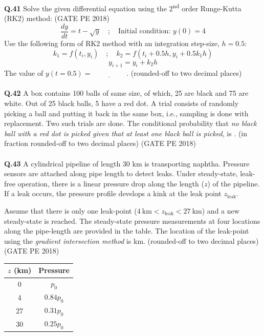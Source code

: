 \documentclass[journal,12pt,onecolumn]{IEEEtran}
\theoremstyle{remark}
\begin{document}
\pagebreak

\noindent\textbf{Q.41} Solve the given differential equation using the 2\textsuperscript{nd} order Runge-Kutta (RK2) method: \hfill (GATE PE 2018)
\[ \frac{dy}{dt} = t - \sqrt{y} \quad ; \quad \text{Initial condition: } y(0) = 4 \]
Use the following form of RK2 method with an integration step-size, $h = 0.5$:
\[ k_1 = f(t_i, y_i) \quad ; \quad k_2 = f(t_i + 0.5h, y_i + 0.5k_1 h) \]
\[ y_{i+1} = y_i + k_2 h \]
The value of $y(t = 0.5) = \underline{\hspace{2cm}}$. (rounded-off to two decimal places)\\\\

\noindent\textbf{Q.42} A box contains 100 balls of same size, of which, 25 are black and 75 are white. Out of 25 black balls, 5 have a red dot. A trial consists of randomly picking a ball and putting it back in the same box, i.e., sampling is done with replacement. Two such trials are done. The conditional probability that \textit{no black ball with a red dot is picked given that at least one black ball is picked}, is \underline{\hspace{2cm}}. (in fraction rounded-off to two decimal places) \hfill (GATE PE 2018)\\\\



\noindent\textbf{Q.43} A cylindrical pipeline of length 30 km is transporting naphtha. Pressure sensors are attached along pipe length to detect leaks. Under steady-state, leak-free operation, there is a linear pressure drop along the length ($z$) of the pipeline. If a leak occurs, the pressure profile develops a kink at the leak point $z_{\text{leak}}$.

\vspace{0.2cm}
Assume that there is only one leak-point ($4~\text{km} < z_{\text{leak}} < 27~\text{km}$) and a new steady-state is reached. The steady-state pressure measurements at four locations along the pipe-length are provided in the table. The location of the leak-point using the \textit{gradient intersection method} is \underline{\hspace{2cm}} km. (rounded-off to two decimal places) \hfill (GATE PE 2018)

\vspace{0.3cm}
\begin{tabular}{|c|c|}
\hline
$z$ (km) & Pressure \\
\hline
0 & $p_0$ \\
4 & $0.84p_0$ \\
27 & $0.31p_0$ \\
30 & $0.25p_0$ \\
\hline
\end{tabular}
\pagebreak
\end{document}
